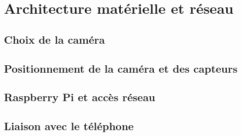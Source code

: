 
\section{Architecture matérielle et réseau}


\subsection{Choix de la caméra}

\subsection{Positionnement de la caméra et des capteurs}

\subsection{Raspberry Pi et accès réseau}

\subsection{Liaison avec le téléphone}
